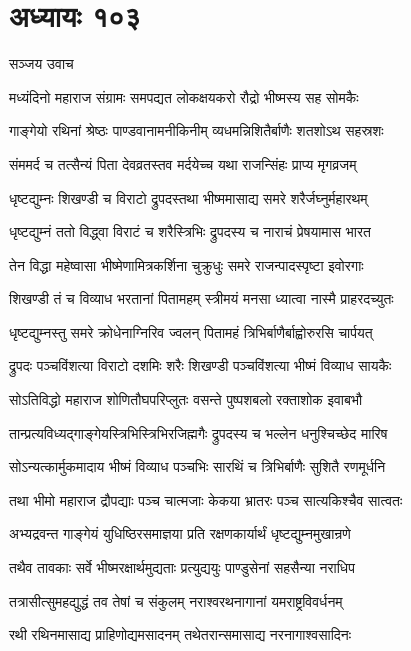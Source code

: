 \chapter{अध्यायः १०३}
\twolineshloka
{सञ्जय उवाच}
{}


\twolineshloka
{मध्यंदिनो महाराज संग्रामः समपद्यत}
{लोकक्षयकरो रौद्रो भीष्मस्य सह सोमकैः}


\twolineshloka
{गाङ्गेयो रथिनां श्रेष्ठः पाण्डवानामनीकिनीम्}
{व्यधमन्निशितैर्बाणैः शतशोऽथ सहस्रशः}


\twolineshloka
{संममर्द च तत्सैन्यं पिता देवव्रतस्तव}
{मर्दयेच्च यथा राजन्सिंहः प्राप्य मृगव्रजम्}


\twolineshloka
{धृष्टद्युम्नः शिखण्डी च विराटो द्रुपदस्तथा}
{भीष्ममासाद्य समरे शरैर्जघ्नुर्महारथम्}


\twolineshloka
{धृष्टद्युम्नं ततो विद्ध्वा विराटं च शरैस्त्रिभिः}
{द्रुपदस्य च नाराचं प्रेषयामास भारत}


\twolineshloka
{तेन विद्धा महेष्वासा भीष्मेणामित्रकर्शिना}
{चुक्रुधुः समरे राजन्पादस्पृष्टा इवोरगाः}


\twolineshloka
{शिखण्डी तं च विव्याध भरतानां पितामहम्}
{स्त्रीमयं मनसा ध्यात्वा नास्मै प्राहरदच्युतः}


\twolineshloka
{धृष्टद्युम्नस्तु समरे क्रोधेनाग्निरिव ज्वलन्}
{पितामहं त्रिभिर्बाणैर्बाह्वोरुरसि चार्पयत्}


\twolineshloka
{द्रुपदः पञ्चविंशत्या विराटो दशमिः शरैः}
{शिखण्डी पञ्चविंशत्या भीष्मं विव्याध सायकैः}


\twolineshloka
{सोऽतिविद्धो महाराज शोणितौघपरिप्लुतः}
{वसन्ते पुष्पशबलो रक्ताशोक इवाबभौ}


\twolineshloka
{तान्प्रत्यविध्यद्गाङ्गेयस्त्रिभिस्त्रिभिरजिह्मगैः}
{द्रुपदस्य च भल्लेन धनुश्चिच्छेद मारिष}


\twolineshloka
{सोऽन्यत्कार्मुकमादाय भीष्मं विव्याध पञ्चभिः}
{सारथिं च त्रिभिर्बाणैः सुशितै रणमूर्धनि}


\twolineshloka
{तथा भीमो महाराज द्रौपद्याः पञ्च चात्मजाः}
{केकया भ्रातरः पञ्च सात्यकिश्चैव सात्वतः}


\twolineshloka
{अभ्यद्रवन्त गाङ्गेयं युधिष्ठिरसमाज्ञया}
{प्रति रक्षणकार्यार्थं धृष्टद्युम्नमुखान्रणे}


\twolineshloka
{तथैव तावकाः सर्वे भीष्मरक्षार्थमुद्यताः}
{प्रत्युद्ययुः पाण्डुसेनां सहसैन्या नराधिप}


\twolineshloka
{तत्रासीत्सुमहद्युद्धं तव तेषां च संकुलम्}
{नराश्वरथनागानां यमराष्ट्रविवर्धनम्}


\twolineshloka
{रथी रथिनमासाद्य प्राहिणोद्यमसादनम्}
{तथेतरान्समासाद्य नरनागाश्वसादिनः}


